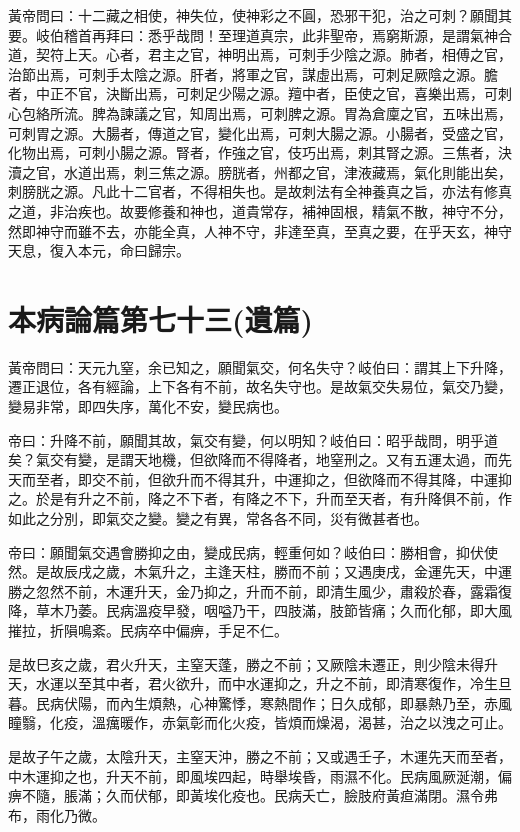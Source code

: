 黃帝問曰：十二藏之相使，神失位，使神彩之不圓，恐邪干犯，治之可刺？願聞其要。岐伯稽首再拜曰：悉乎哉問！至理道真宗，此非聖帝，焉窮斯源，是謂氣神合道，契符上天。心者，君主之官，神明出焉，可刺手少陰之源。肺者，相傅之官，治節出焉，可刺手太陰之源。肝者，將軍之官，謀虛出焉，可刺足厥陰之源。膽者，中正不官，決斷出焉，可刺足少陽之源。羶中者，臣使之官，喜樂出焉，可刺心包絡所流。脾為諫議之官，知周出焉，可刺脾之源。胃為倉廩之官，五味出焉，可刺胃之源。大腸者，傳道之官，變化出焉，可刺大腸之源。小腸者，受盛之官，化物出焉，可刺小腸之源。腎者，作強之官，伎巧出焉，刺其腎之源。三焦者，決瀆之官，水道出焉，刺三焦之源。膀胱者，州都之官，津液藏焉，氣化則能出矣，刺膀胱之源。凡此十二官者，不得相失也。是故刺法有全神養真之旨，亦法有修真之道，非治疾也。故要修養和神也，道貴常存，補神固根，精氣不散，神守不分，然即神守而雖不去，亦能全真，人神不守，非達至真，至真之要，在乎天玄，神守天息，復入本元，命曰歸宗。

\section{本病論篇第七十三(遺篇)}

黃帝問曰：天元九窒，余已知之，願聞氣交，何名失守？岐伯曰：謂其上下升降，遷正退位，各有經論，上下各有不前，故名失守也。是故氣交失易位，氣交乃變，變易非常，即四失序，萬化不安，變民病也。

帝曰：升降不前，願聞其故，氣交有變，何以明知？岐伯曰：昭乎哉問，明乎道矣？氣交有變，是謂天地機，但欲降而不得降者，地窒刑之。又有五運太過，而先天而至者，即交不前，但欲升而不得其升，中運抑之，但欲降而不得其降，中運抑之。於是有升之不前，降之不下者，有降之不下，升而至天者，有升降俱不前，作如此之分別，即氣交之變。變之有異，常各各不同，災有微甚者也。

帝曰：願聞氣交遇會勝抑之由，變成民病，輕重何如？岐伯曰：勝相會，抑伏使然。是故辰戌之歲，木氣升之，主逢天柱，勝而不前；又遇庚戌，金運先天，中運勝之忽然不前，木運升天，金乃抑之，升而不前，即清生風少，肅殺於春，露霜復降，草木乃萎。民病溫疫早發，咽嗌乃干，四肢滿，肢節皆痛；久而化郁，即大風摧拉，折隕鳴紊。民病卒中偏痹，手足不仁。

是故巳亥之歲，君火升天，主窒天蓬，勝之不前；又厥陰未遷正，則少陰未得升天，水運以至其中者，君火欲升，而中水運抑之，升之不前，即清寒復作，冷生旦暮。民病伏陽，而內生煩熱，心神驚悸，寒熱間作；日久成郁，即暴熱乃至，赤風瞳翳，化疫，溫癘暖作，赤氣彰而化火疫，皆煩而燥渴，渴甚，治之以洩之可止。

是故子午之歲，太陰升天，主窒天沖，勝之不前；又或遇壬子，木運先天而至者，中木運抑之也，升天不前，即風埃四起，時舉埃昏，雨濕不化。民病風厥涎潮，偏痹不隨，脹滿；久而伏郁，即黃埃化疫也。民病夭亡，臉肢府黃疸滿閉。濕令弗布，雨化乃微。

